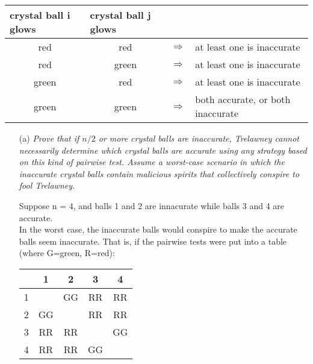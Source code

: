 \documentclass[12pt]{article} \setlength{\oddsidemargin}{0in}
\begin{document}
{\begin{center}
  \centering
  \begin{tabular}{ccll}
    \multicolumn{1}{l}{crystal ball i glows} & \multicolumn{1}{l}{crystal ball j glows}  &  \\ \hline
    red                                      & red                                       & $\Rightarrow$ & at least one is inaccurate \\
    red                                      & green                                     & $\Rightarrow$ & at least one is inaccurate \\
    green                                    & red                                       & $\Rightarrow$ & at least one is inaccurate \\
    green                                    & green                                     & $\Rightarrow$ & both accurate, or both inaccurate
  \end{tabular}
\end{center}

\begin{enumerate}
\item[(a)]{\textit{Prove that if $n/2$ or more crystal balls are inaccurate,
    Trelawney cannot necessarily determine which crystal balls are
    accurate using any strategy based on this kind of pairwise
    test. Assume a worst-case scenario in which the inaccurate crystal
    balls contain malicious spirits that collectively conspire to fool
    Trelawney.}} 

  \medskip 

  Suppose n = 4, and balls 1 and 2 are innacurate while balls 3 and 4 are accurate.\\
  In the worst case, the inaccurate balls would conspire to make the accurate balls seem inaccurate. That is, if the pairwise tests were put into a table (where G=green, R=red):
  \begin{center}
  \begin{tabular}{ |c|c|c|c|c| } 
   \hline
    & 1 & 2 & 3 & 4 \\ 
   \hline
   1 &  & GG & RR & RR \\ 
   2 & GG &  & RR & RR \\ 
   3 & RR & RR &  & GG \\ 
   4 & RR & RR & GG &  \\ 
   \hline
  \end{tabular}
  \end{center}


\end{enumerate}}
\end{document}

